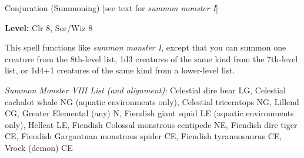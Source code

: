 
Conjuration (Summoning) [see text for \textit{summon monster I}]

\textbf{Level:} Clr 8, Sor/Wiz 8

This spell functions like \textit{summon monster I}, except that you can summon 
one creature from the 8th-level list, 1d3 creatures of the same kind from the 7th-level 
list, or 1d4+1 creatures of the same kind from a lower-level list.

\textit{Summon Monster VIII List (and alignment):} Celestial dire bear LG, Celestial cachalot whale NG (aquatic environments only), Celestial triceratops NG, Lillend CG, Greater Elemental (any) N, Fiendish giant squid LE (aquatic environments only), Hellcat LE, Fiendish Colossal monstrous centipede NE, Fiendish dire tiger CE, Fiendish Gargantuan monstrous spider CE, Fiendish tyrannosaurus CE, Vrock (demon) CE
